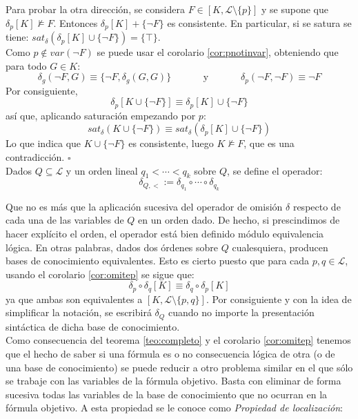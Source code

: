 Para probar la otra dirección, se considera $F\in [K, \mathcal{L} \setminus \{ p \}]$ y se supone que $\delta_p [K] \nvDash F$. Entonces $\delta_p [K] + \{ \neg F \}$ es consistente. En particular, si se satura se tiene: $sat_{\delta}(\delta_p [K] \cup \{ \neg F \}) = \{ \top \}$.\\
Como $p \notin var(\neg F)$ se puede usar el corolario \ref{cor:pnotinvar}, obteniendo que para todo $G\in K$:
$$\delta_g (\neg F, G) \equiv \{ \neg F, \delta_g  (G,G)  \} \;\;\;\;\;\;\;\;\;\;\;\; \text{y} \;\;\;\;\;\;\;\;\;\;\;\; \delta_p (\neg F , \neg F) \equiv \neg F$$
Por consiguiente,
$$\delta_p [K \cup \{ \neg F \}] \equiv \delta_p [K] \cup \{ \neg F \}$$
así que, aplicando saturación empezando por $p$:
$$sat_{\delta}(K \cup \{ \neg F \}) \equiv sat_{\delta}(\delta_p [K] \cup \{ \neg F \})$$
Lo que indica que $K \cup \{ \neg F \}$ es consistente, luego $K \nvDash F$, que es una contradicción. $\square$\\

Dados $Q \subseteq \mathcal{L}$ y un orden lineal $q_1 < \cdots < q_k$ sobre $Q$, se define el operador: $$\delta_{Q,<} := \delta_{q_1} \circ \cdots \circ \delta_{q_k}$$

Que no es más que la aplicación sucesiva del operador de omisión $\delta$ respecto de cada una de las variables de $Q$ en un orden dado. De hecho, si prescindimos de hacer explícito el orden, el operador está bien definido módulo equivalencia lógica. En otras palabras, dados dos órdenes sobre $Q$ cualesquiera, producen bases de conocimiento equivalentes. Esto es cierto puesto que para cada $p,q \in \mathcal{L}$, usando el corolario \ref{cor:omitep} se sigue que:
$$ \delta_p \circ \delta_q [K] \equiv \delta_q \circ \delta_p [K]$$
\noindent ya que ambas son equivalentes a $[K, \mathcal{L} \setminus \{ p,q \}]$. Por consiguiente y con la idea de simplificar la notación, se escribirá $\delta_Q$ cuando no importe la presentación sintáctica de dicha base de conocimiento.\\

Como consecuencia del teorema \ref{teo:completo} y el corolario \ref{cor:omitep} tenemos que el hecho de saber si una fórmula es o no consecuencia lógica de otra (o de una base de conocimiento) se puede reducir a otro problema similar en el que sólo se trabaje con las variables de la fórmula objetivo. Basta con eliminar de forma sucesiva todas las variables de la base de conocimiento que no ocurran en la fórmula objetivo. A esta propiedad se le conoce como \textit{Propiedad de localización}:

